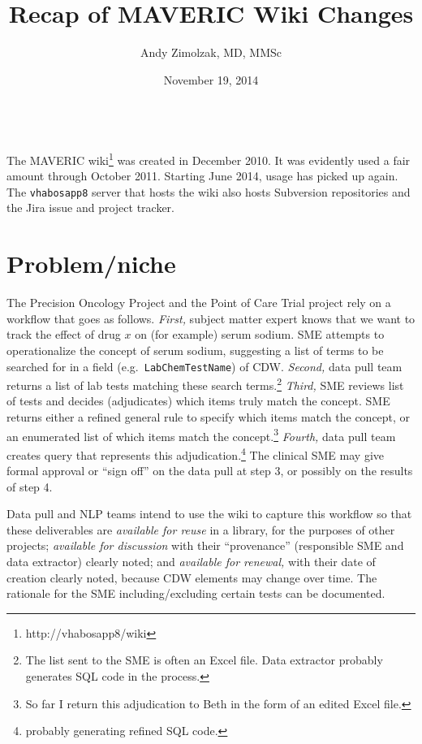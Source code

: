 \documentclass{tufte-handout}
\title{Recap of MAVERIC Wiki Changes}
\author{Andy Zimolzak, MD, MMSc}
\date{November 19, 2014}
\begin{document}
\maketitle

~\\

The MAVERIC wiki\footnote{http://vhabosapp8/wiki} was created in
December 2010. It was evidently used a fair amount through October
2011. Starting June 2014, usage has picked up again. The
\texttt{vhabosapp8} server that hosts the wiki also hosts Subversion
repositories and the Jira issue and project tracker.

\section{Problem/niche}

The Precision Oncology Project and the Point of Care Trial project
rely on a workflow that goes as follows. \emph{First,} subject matter
expert knows that we want to track the effect of drug $x$ on (for
example) serum sodium. SME attempts to operationalize the concept of
serum sodium, suggesting a list of terms to be searched for in a field
(e.g.\ \texttt{LabChemTestName}) of CDW. \emph{Second,} data pull team
returns a list of lab tests matching these search terms.\footnote{The
  list sent to the SME is often an Excel file. Data extractor probably
  generates SQL code in the process.} \emph{Third,} SME reviews list
of tests and decides (adjudicates) which items truly match the
concept. SME returns either a refined general rule to specify which
items match the concept, or an enumerated list of which items match
the concept.\footnote{So far I return this adjudication to Beth in the
  form of an edited Excel file.} \emph{Fourth,} data pull team creates
query that represents this adjudication.\footnote{probably generating
  refined SQL code.} The clinical SME may give formal approval or
``sign off'' on the data pull at step 3, or possibly on the results of
step 4.

Data pull and NLP teams intend to use the wiki to capture this
workflow so that these deliverables are \emph{available for reuse} in
a library, for the purposes of other projects; \emph{available for
  discussion} with their ``provenance'' (responsible SME and data
extractor) clearly noted; and \emph{available for renewal,} with their
date of creation clearly noted, because CDW elements may change over
time. The rationale for the SME including/excluding certain tests can
be documented. 
\end{document}
